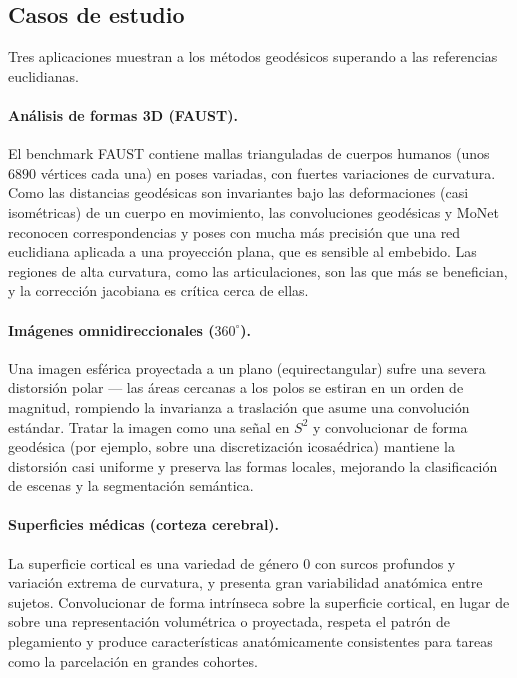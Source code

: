 \subsection{Casos de estudio}
\label{subsec:geo:cases}

Tres aplicaciones muestran a los m\'etodos geod\'esicos superando a las
referencias euclidianas.

\paragraph{An\'alisis de formas 3D (FAUST).}
El benchmark FAUST contiene mallas trianguladas de cuerpos humanos (unos $6890$
v\'ertices cada una) en poses variadas, con fuertes variaciones de curvatura.
Como las distancias geod\'esicas son invariantes bajo las deformaciones (casi
isom\'etricas) de un cuerpo en movimiento, las convoluciones geod\'esicas y MoNet
reconocen correspondencias y poses con mucha m\'as precisi\'on que una red
euclidiana aplicada a una proyecci\'on plana, que es sensible al embebido. Las
regiones de alta curvatura, como las articulaciones, son las que m\'as se
benefician, y la correcci\'on jacobiana es cr\'itica cerca de ellas.

\paragraph{Im\'agenes omnidireccionales ($360^\circ$).}
Una imagen esf\'erica proyectada a un plano (equirectangular) sufre una severa
distorsi\'on polar --- las \'areas cercanas a los polos se estiran en un orden de
magnitud, rompiendo la invarianza a traslaci\'on que asume una convoluci\'on
est\'andar. Tratar la imagen como una se\~nal en $S^2$ y convolucionar de forma
geod\'esica (por ejemplo, sobre una discretizaci\'on icosa\'edrica) mantiene la
distorsi\'on casi uniforme y preserva las formas locales, mejorando la
clasificaci\'on de escenas y la segmentaci\'on sem\'antica.

\paragraph{Superficies m\'edicas (corteza cerebral).}
La superficie cortical es una variedad de g\'enero 0 con surcos profundos y
variaci\'on extrema de curvatura, y presenta gran variabilidad anat\'omica entre
sujetos. Convolucionar de forma intr\'inseca sobre la superficie cortical, en
lugar de sobre una representaci\'on volum\'etrica o proyectada, respeta el
patr\'on de plegamiento y produce caracter\'isticas anat\'omicamente
consistentes para tareas como la parcelaci\'on en grandes cohortes.

